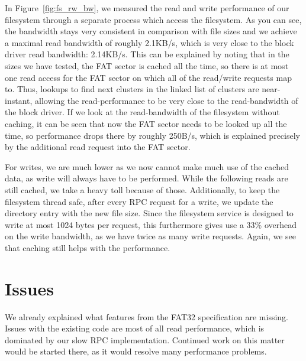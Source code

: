 In Figure~\ref{fig:fs_rw_bw}, we measured the read and write performance of our filesystem through a separate process which access the filesystem.
As you can see, the bandwidth stays very consistent in comparison with file sizes and we achieve a maximal read bandwidth of roughly 2.1KB/s,
which is very close to the block driver read bandwidth: 2.14KB/s. This can be explained by noting that in the sizes we have tested,
the FAT sector is cached all the time, so there is at most one read access for the FAT sector on which all of the read/write requests map to.
Thus, lookups to find next clusters in the linked list of clusters are near-instant, allowing the read-performance to be very close to the 
read-bandwidth of the block driver. If we look at the read-bandwidth of the filesystem without caching, it can be seen that now the FAT
sector needs to be looked up all the time, so performance drops there by roughly 250B/s, which is explained precisely by the additional read request into the 
FAT sector.

For writes, we are much lower as we now cannot make much use of the cached data, as write will always have to be performed. While the following reads
are still cached, we take a heavy toll because of those. Additionally, to keep the filesystem thread safe, after every RPC request for a write,
we update the directory entry with the new file size. Since the filesystem service is designed to write at most 1024 bytes per request, this 
furthermore gives use a 33\% overhead on the write bandwidth, as we have twice as many write requests.
Again, we see that caching still helps with the performance.


\section{Issues}
We already explained what features from the FAT32 specification are missing. Issues with the existing code are most of all
read performance, which is dominated by our slow RPC implementation. Continued work on this matter would be started there,
as it would resolve many performance problems.